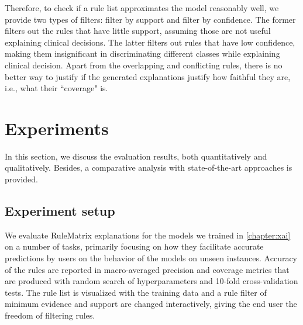 \hspace*{3.5mm} Therefore, to check if a rule list approximates the model reasonably well, we provide two types of filters: filter by support and filter by confidence. The former filters out the rules that have little support, assuming those are not useful explaining clinical decisions. The latter filters out rules that have low confidence, making them insignificant in discriminating different classes while explaining clinical decision. Apart from the overlapping and conflicting rules, there is no better way to justify if the generated explanations justify how faithful they are, i.e., what their ``coverage" is. 



\section{Experiments} \label{chapter_7:results}
In this section, we discuss the evaluation results, both quantitatively and qualitatively. Besides, a comparative analysis with state-of-the-art approaches is provided. 

\subsection{Experiment setup}
We evaluate RuleMatrix explanations for the models we trained in \cref{chapter:xai} on a number of tasks, primarily focusing on how they facilitate accurate predictions by users on the behavior of the models on unseen instances. 
Accuracy of the rules are reported in macro-averaged precision and coverage metrics that are produced with random search of hyperparameters and 10-fold cross-validation tests. The rule list is visualized with the training data and a rule filter of minimum evidence and support are changed interactively, giving the end user the freedom of filtering rules. 

